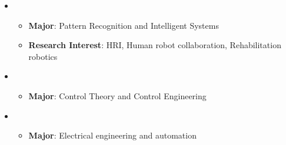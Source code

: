   \begin{itemize}[leftmargin=*]
    \item
      {\small
      \begin{itemize}
        \item \textbf{Major}: Pattern Recognition and Intelligent Systems
        \item{\textbf{Research Interest}: HRI, Human robot collaboration, Rehabilitation robotics}
      \end{itemize}}
      
    \item
      {\small
      \begin{itemize}
        \item \textbf{Major}: Control Theory and Control Engineering
      \end{itemize}
      }

      \item
      {\small
      \begin{itemize}
        \item \textbf{Major}: Electrical engineering and automation
      \end{itemize}
      }

  \end{itemize}